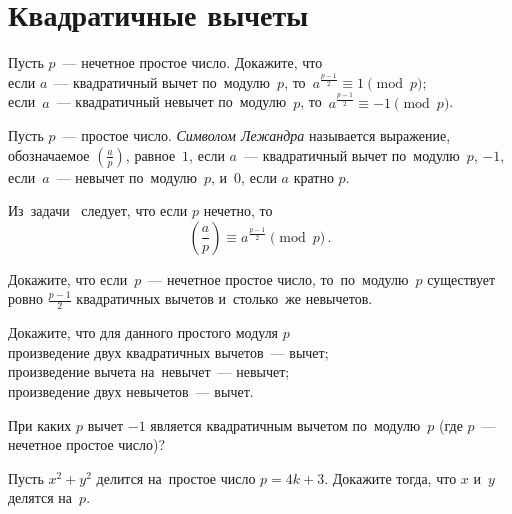 
\section*{Квадратичные вычеты}


\begin{problems}

\def\legendre{\genfrac{(}{)}{0.5pt}{}}

\item
{}%
Пусть $p$~--- нечетное простое число.
Докажите, что
\\
\subproblem
если $a$~--- квадратичный вычет по~модулю~$p$,
то~$a^{\frac{p-1}{2}} \equiv 1 \pmod{p}$;
\\
\subproblem
если~$a$~--- квадратичный невычет по~модулю~$p$,
то~$a^{\frac{p-1}{2}} \equiv -1 \pmod{p}$.

Пусть $p$~--- простое число.
\emph{Символом Лежандра} называется выражение, обозначаемое
$\legendre{a}{p}$,
равное~$1$, если $a$~--- квадратичный вычет по~модулю~$p$,
$-1$, если~$a$~--- невычет по~модулю~$p$,
и~$0$, если $a$ кратно $p$.

Из~задачи~ следует, что
если $p$ нечетно, то
\[
    \legendre{a}{p} \equiv a^{\frac{p-1}{2}} \pmod{p}
\, . \]

\item
Докажите, что если~$p$~--- нечетное простое число, то~по~модулю~$p$ существует
ровно $\frac{p-1}{2}$ квадратичных вычетов и~столько~же невычетов.

\item
Докажите, что для данного простого модуля $p$
\\
\subproblem произведение двух квадратичных вычетов~--- вычет;
\\
\subproblem произведение вычета на~невычет~--- невычет;
\\
\subproblem произведение двух невычетов~--- вычет.

\item
При каких $p$ вычет $-1$ является квадратичным вычетом по~модулю~$p$
(где $p$~--- нечетное простое число)?

\item
Пусть $x^2 + y^2$ делится на~простое число $p = 4 k + 3$.
Докажите тогда, что $x$ и~$y$ делятся на~$p$.


\end{problems}
